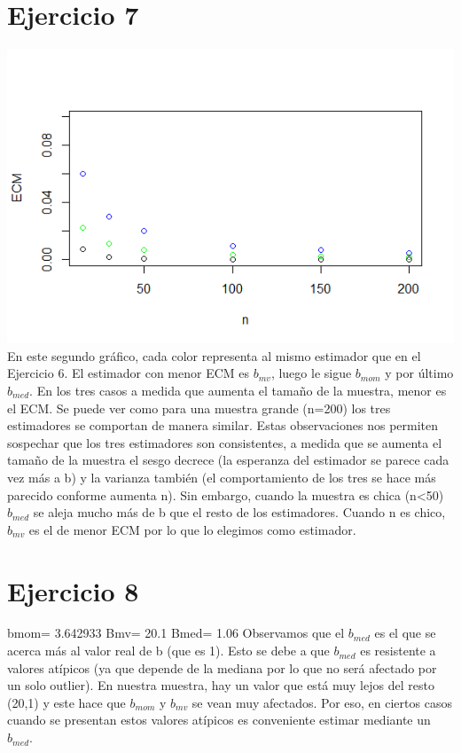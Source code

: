 \documentclass{article}
\begin{document}
\section{Ejercicio 7}
\includegraphics[scale=0.85]{ej7.png}
En este segundo gráfico, cada color representa al mismo estimador que en el Ejercicio 6. El estimador con menor ECM es $b_{mv}$, luego le sigue $b_{mom}$ y por último $b_{med}$. En los tres casos a medida que aumenta el tamaño de la muestra, menor es el ECM.  Se puede ver como para una muestra grande (n=200) los tres estimadores se comportan de manera similar. Estas observaciones nos permiten sospechar que los tres estimadores son consistentes, a medida que se aumenta el tamaño de la muestra el sesgo decrece (la esperanza del estimador se parece cada vez más a b) y la varianza también (el comportamiento de los tres se hace más parecido conforme aumenta n). Sin embargo, cuando la muestra es chica (n<50) $b_{med}$ se aleja mucho más de b que el resto de los estimadores. Cuando n es chico, $b_{mv}$ es el de menor ECM por lo que lo elegimos como estimador.

\section{Ejercicio 8}
bmom= 3.642933
Bmv= 20.1
Bmed= 1.06
Observamos que el $b_{med}$ es el que se acerca más al valor real de b (que es 1). Esto se debe a que $b_{med}$ es resistente a valores atípicos (ya que depende de la mediana por lo que no será afectado por un solo outlier). En nuestra muestra, hay un valor que está muy lejos del resto (20,1) y este hace que $b_{mom}$ y $b_{mv}$ se vean muy afectados. Por eso, en ciertos casos cuando se presentan estos valores atípicos es conveniente estimar mediante un $b_{med}$. 
\end{document}
